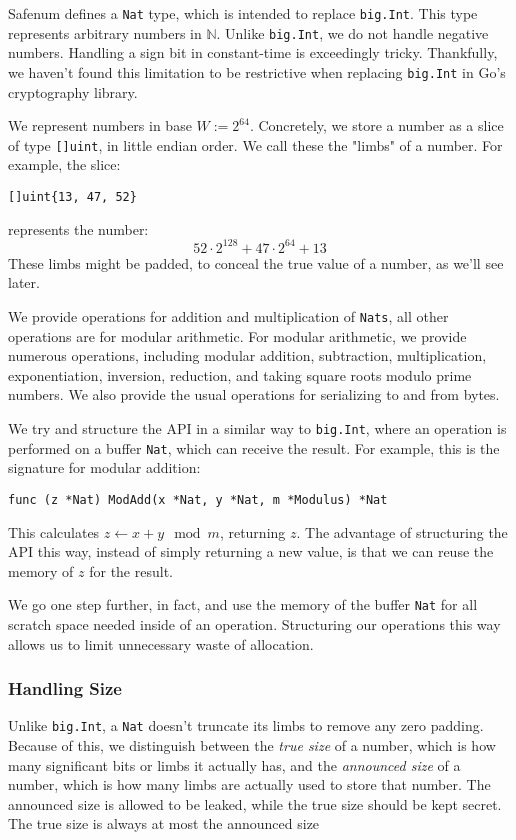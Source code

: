 \documentclass[11pt, a4paper]{article} %
\begin{document}
{Safenum defines a \texttt{Nat} type, which is intended to
replace \texttt{big.Int}. This type represents arbitrary
numbers in $\mathbb{N}$. Unlike \texttt{big.Int}, we do not handle
negative numbers. Handling a sign bit in constant-time is exceedingly
tricky. Thankfully, we haven't found this limitation to be restrictive
when replacing \texttt{big.Int} in Go's cryptography library.

We represent numbers in base $W := 2^{64}$. Concretely, we
store a number as a slice of type \texttt{[]uint}, in little
endian order. We call these the "limbs" of a number. For example,
the slice:
\begin{verbatim}
[]uint{13, 47, 52}
\end{verbatim}
represents the number:
$$
52 \cdot 2^{128} + 47 \cdot 2^{64} + 13
$$
These limbs might be padded, to conceal the true value of a number,
as we'll see later.

We provide operations for addition and multiplication of \texttt{Nats},
all other operations are for modular arithmetic. For modular arithmetic,
we provide numerous operations, including modular addition, subtraction,
multiplication, exponentiation, inversion, reduction, and taking
square roots modulo prime numbers. We also provide the usual operations
for serializing to and from bytes.

We try and structure the API in a similar way to \texttt{big.Int},
where an operation is performed on a buffer \texttt{Nat}, which
can receive the result. For example, this is the signature for
modular addition:

\begin{verbatim}
func (z *Nat) ModAdd(x *Nat, y *Nat, m *Modulus) *Nat
\end{verbatim}

This calculates $z \leftarrow x + y \mod m$, returning $z$. The advantage
of structuring the API this way, instead of simply returning a new
value, is that we can reuse the memory of $z$ for the result.

We go one step further, in fact, and use the memory of the buffer
\texttt{Nat} for all scratch space needed inside of an operation.
Structuring our operations this way allows us to limit unnecessary waste
of allocation.

\subsubsection{Handling Size}

Unlike \texttt{big.Int}, a \texttt{Nat} doesn't truncate its limbs
to remove any zero padding. Because of this, we distinguish
between the \emph{true size} of a number, which is how many significant
bits or limbs it actually has, and the \emph{announced size}
of a number, which is how many limbs are actually used to store
that number. The announced size is allowed to be leaked, while the
true size should be kept secret. The true size is always
at most the announced size

}
\end{document}
